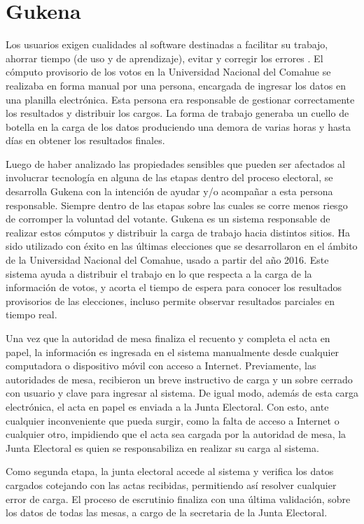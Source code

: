 \label{Gukena}
\chapter{Gukena}
Los usuarios exigen cualidades al software destinadas a facilitar su trabajo, ahorrar tiempo (de uso y de aprendizaje), evitar y corregir los errores \cite{definicionUsuarioInterfaz}. El cómputo provisorio de los votos en la Universidad Nacional del Comahue se realizaba en forma manual por una persona, encargada de ingresar los datos en una planilla electrónica. Esta persona era responsable de gestionar correctamente los resultados y distribuir los cargos. La forma de trabajo generaba un cuello de botella en la carga de los datos produciendo una demora de varias horas y hasta días en obtener los resultados finales.

Luego de haber analizado las propiedades sensibles que pueden ser afectados al involucrar tecnología en alguna de las etapas dentro del proceso electoral, se desarrolla Gukena con la intención de ayudar y/o acompañar a esta persona responsable. Siempre dentro de las etapas sobre las cuales se corre menos riesgo de corromper la voluntad del votante. Gukena es un sistema responsable de realizar estos cómputos y distribuir la carga de trabajo hacia distintos sitios. Ha sido utilizado con éxito en las últimas elecciones que se desarrollaron en el ámbito de la Universidad Nacional del Comahue, usado a partir del año 2016. Este sistema ayuda a distribuir el trabajo en lo que respecta a la carga de la información de votos, y acorta el tiempo de espera para conocer los resultados provisorios de las elecciones, incluso permite observar resultados parciales en tiempo real.\newline

Una vez que la autoridad de mesa finaliza el recuento y completa el acta en papel,  la información es ingresada en el sistema manualmente desde cualquier computadora o dispositivo móvil con acceso a Internet. Previamente, las autoridades de mesa, recibieron un breve instructivo de carga y un sobre cerrado con usuario y clave para ingresar al sistema. De igual modo, además de esta carga electrónica, el acta en papel es enviada a la Junta Electoral. Con esto, ante cualquier inconveniente que pueda surgir, como la falta de acceso a Internet o cualquier otro,  impidiendo que el acta sea cargada por la autoridad de mesa, la Junta Electoral es quien se responsabiliza en realizar su carga al sistema.

Como segunda etapa, la junta electoral accede al sistema y verifica los datos cargados cotejando con las actas recibidas, permitiendo así resolver cualquier error de carga. 
El proceso de escrutinio finaliza con una última validación, sobre los datos de todas las mesas, a cargo de la secretaria de la Junta Electoral. 

